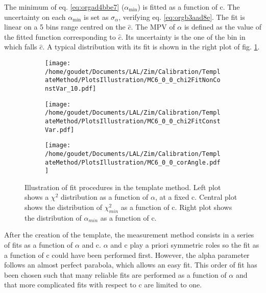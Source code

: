 The minimum of eq. \ref{eq:orgad4bbe7} (\(\alpha_{\text{min}}\)) is fitted as a function of c.
The uncertainty on each \(\alpha_{\text{min}}\) is set as \(\sigma_{\alpha}\), verifying eq. \ref{eq:orgb3aad8e}.
The fit is linear on a 5 bins range centred on the \(\hat{c}\).
The MPV of $\alpha$ is defined as the value of the fitted function corresponding to \(\hat{c}\).
Its uncertainty is the one of the bin in which falls \(\hat{c}\).
A typical distribution with its fit is shown in the right plot of fig. \ref{orged35c4f}.

\begin{figure}
\begin{subfigure}[t]{0.32\linewidth}
\begin{center}
\texttt{[image: /home/goudet/Documents/LAL/Zim/Calibration/TemplateMethod/PlotsIllustration/MC6\_0\_0\_chi2FitNonConstVar\_10.pdf]}
\end{center}
\end{subfigure}
\begin{subfigure}[t]{0.32\linewidth}
\begin{center}
\texttt{[image: /home/goudet/Documents/LAL/Zim/Calibration/TemplateMethod/PlotsIllustration/MC6\_0\_0\_chi2FitConstVar.pdf]}
\end{center}
\end{subfigure}
\begin{subfigure}[t]{0.32\linewidth}
\begin{center}
\texttt{[image: /home/goudet/Documents/LAL/Zim/Calibration/TemplateMethod/PlotsIllustration/MC6\_0\_0\_corAngle.pdf]}
\end{center}
\end{subfigure}
\caption{\label{orged35c4f}
Illustration of fit procedures in the template method. Left plot shows a \(\chi^2\) distribution as a function of $\alpha$, at a fixed c. Central plot shows the distribution of \(\chi_{min}^2\) as a function of c. Right plot shows the distribution of \(\alpha_{min}\) as a function of c.}
\end{figure}

After the creation of the template, the measurement method consists in a series of fits as a function of $\alpha$ and c.
$\alpha$ and c play a priori symmetric roles so the fit as a function of c could have been performed first.
However, the alpha parameter follows an almost perfect parabola, which allows an easy fit.
This order of fit has been chosen such that many reliable fits are performed as a function of $\alpha$ and that more complicated fits with respect to c are limited to one.


